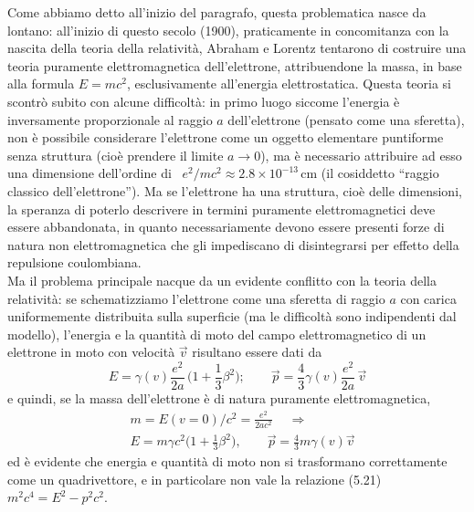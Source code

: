 Come abbiamo detto all'inizio del paragrafo, questa problematica nasce da
lontano: all'inizio di questo secolo (1900), praticamente in concomitanza con la
nascita della teoria della relativit\`a, Abraham e Lorentz tentarono di
costruire una teoria puramente elettromagnetica dell'elettrone, attribuendone la
massa, in base alla formula $E=mc^2$, esclusivamente all'energia elettrostatica.
Questa teoria si scontr\`o subito con alcune difficolt\`a: in primo luogo
siccome l'energia \`e inversamente proporzionale al raggio $a$ dell'elettrone
(pensato come una sferetta), non \`e possibile considerare l'elettrone come un
oggetto elementare puntiforme senza struttura (cio\`e prendere il limite
$a\to0$), ma \`e necessario attribuire ad esso una dimensione dell'ordine di
\ $e^2/mc^2\approx2.8\times10^{-13}$\,cm (il cosiddetto ``raggio classico
dell'elettrone''). Ma se l'elettrone ha una struttura, cio\`e delle dimensioni,
la speranza di poterlo descrivere in termini puramente elettromagnetici deve
essere abbandonata, in quanto necessariamente devono essere presenti forze di
natura non elettromagnetica che gli impediscano di disintegrarsi per effetto
della repulsione coulombiana.\\
Ma il problema principale nacque da un evidente conflitto con la teoria della
relativit\`a: se schematizziamo l'elettrone come una sferetta di raggio $a$ con
carica uniformemente
distribuita sulla superficie (ma le difficolt\`a sono indipendenti dal modello),
l'energia e la quantit\`a di moto del campo elettromagnetico di un elettrone in
moto con velocit\`a $\vec v$ risultano essere dati da
\begin{equation}
  E=\gamma(v)\frac{e^2}{2a}\,\big(1+\frac{1}{3}\beta^2\big);
  \qquad\vec p=\frac{4}{3}\gamma(v)\frac{e^2}{2a}\,\vec v
  \tag{11.41}
\end{equation}
e quindi, se la massa dell'elettrone \`e di natura puramente elettromagnetica,
\begin{equation}
  \begin{aligned}
    &m=E(v=0)/c^2=\frac{e^2}{2ac^2}\quad\ \Rightarrow\\
    &E=m\gamma c^2\big(1+\frac{1}{3}\beta^2\big),
    \qquad\vec p=\frac{4}{3}m\gamma(v)\vec v
  \end{aligned}
  \tag{11.42}
\end{equation}
ed \`e evidente che energia e quantit\`a di moto non si trasformano
correttamente come un quadrivettore, e in particolare non vale la relazione
(5.21) \ $m^2c^4=E^2-p^2c^2$.

